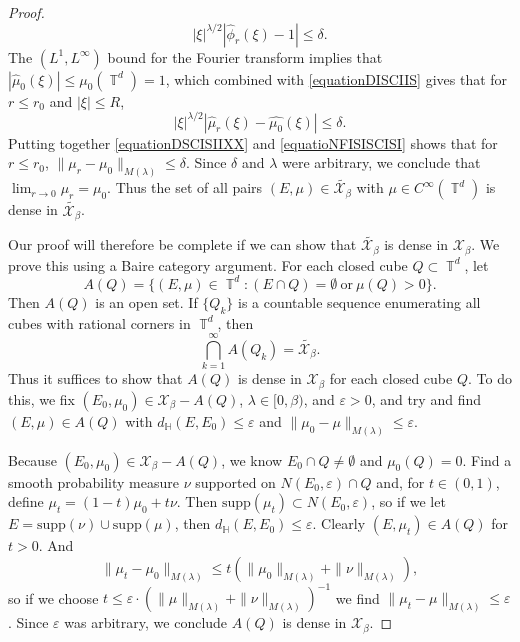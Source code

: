 \documentclass[dvipsnames,letterpaper,12pt]{article}
\numberwithin{equation}{section}
\DeclareMathOperator{\TT}{\mathbb{T}}
\numberwithin{theorem}{section}
\begin{document}
\begin{proof}
    \begin{equation} \label{equationDISCIIS}
        |\xi|^{\lambda/2} |\widehat{\phi}_r(\xi) - 1| \leq \delta.
    \end{equation}
    The $(L^1,L^\infty)$ bound for the Fourier transform implies that $|\widehat{\mu}_0(\xi)| \leq \mu_0(\TT^d) = 1$, which combined with \eqref{equationDISCIIS} gives that for $r \leq r_0$ and $|\xi| \leq R$,
    \begin{equation} \label{equatioNFISISCISI}
        |\xi|^{\lambda/2} |\widehat{\mu}_r(\xi) - \widehat{\mu_0}(\xi)| \leq \delta.
    \end{equation}
    Putting together \eqref{equationDSCISIIXX} and \eqref{equatioNFISISCISI} shows that for $r \leq r_0$, $\| \mu_r - \mu_0 \|_{M(\lambda)} \leq \delta$. Since $\delta$ and $\lambda$ were arbitrary, we conclude that $\lim_{r \to 0} \mu_r = \mu_0$. Thus the set of all pairs $(E,\mu) \in \tilde{\mathcal{X}_\beta}$ with $\mu \in C^\infty(\TT^d)$ is dense in $\tilde{\mathcal{X}_\beta}$.

    Our proof will therefore be complete if we can show that $\tilde{\mathcal{X}_\beta}$ is dense in $\mathcal{X}_\beta$. We prove this using a Baire category argument. For each closed cube $Q \subset \TT^d$, let
    \[ A(Q) = \{ (E,\mu) \in \TT^d: (E \cap Q) = \emptyset\ \text{or}\ \mu(Q) > 0 \}. \]
    Then $A(Q)$ is an open set. If $\{ Q_k \}$ is a countable sequence enumerating all cubes with rational corners in $\TT^d$, then
    \begin{equation}
        \bigcap_{k = 1}^\infty A(Q_k) = \tilde{\mathcal{X}_\beta}.
    \end{equation}
    Thus it suffices to show that $A(Q)$ is dense in $\mathcal{X}_\beta$ for each closed cube $Q$. To do this, we fix $(E_0,\mu_0) \in \mathcal{X}_\beta - A(Q)$, $\lambda \in [0,\beta)$, and $\varepsilon > 0$, and try and find $(E,\mu) \in A(Q)$ with $d_\mathbb{H}(E,E_0) \leq \varepsilon$ and $\| \mu_0 - \mu \|_{M(\lambda)} \leq \varepsilon$.

    Because $(E_0,\mu_0) \in \mathcal{X}_\beta - A(Q)$, we know $E_0 \cap Q \neq \emptyset$ and $\mu_0(Q) = 0$. Find a smooth probability measure $\nu$ supported on $N(E_0,\varepsilon) \cap Q$ and, for $t \in (0,1)$, define $\mu_t = (1 - t) \mu_0 + t \nu$. Then $\text{supp}(\mu_t) \subset N(E_0,\varepsilon)$, so if we let $E = \text{supp}(\nu) \cup \text{supp}(\mu)$, then $d_\mathbb{H}(E,E_0) \leq \varepsilon$. Clearly $(E,\mu_t) \in A(Q)$ for $t > 0$. And
    \begin{equation}
        \| \mu_t - \mu_0 \|_{M(\lambda)} \leq t \left( \| \mu_0 \|_{M(\lambda)} + \| \nu \|_{M(\lambda)} \right),
    \end{equation}
    so if we choose $t \leq \varepsilon \cdot (\| \mu \|_{M(\lambda)} + \| \nu \|_{M(\lambda)})^{-1}$ we find $\| \mu_t - \mu \|_{M(\lambda)} \leq \varepsilon$. Since $\varepsilon$ was arbitrary, we conclude $A(Q)$ is dense in $\mathcal{X}_\beta$.
\end{proof}
\end{document}

